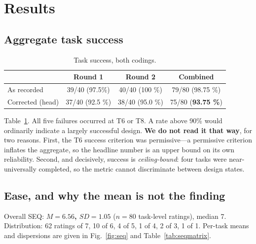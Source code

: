 \documentclass[conference]{IEEEtran}
\begin{document}
\section{Results}

\subsection{Aggregate task success}

\begin{table}[t]
\caption{Task success, both codings.}
\label{tab:success}
\centering
\begin{tabular}{@{}lccc@{}}
\toprule
 & Round 1 & Round 2 & Combined \\
\midrule
As recorded      & 39/40 (97.5\%) & 40/40 (100 \%) & 79/80 (98.75 \%) \\
Corrected (head) & 37/40 (92.5 \%) & 38/40 (95.0 \%) & 75/80 (\textbf{93.75 \%}) \\
\bottomrule
\end{tabular}
\end{table}

Table~\ref{tab:success}. All five failures occurred at T6 or T8. A rate above
90\% would ordinarily indicate a largely successful design. \textbf{We do not
read it that way}, for two reasons. First, the T6 success criterion was
permissive---a permissive criterion inflates the aggregate, so the headline
number is an upper bound on its own reliability. Second, and decisively,
success is \emph{ceiling-bound}: four tasks were near-universally completed, so
the metric cannot discriminate between design states.

\subsection{Ease, and why the mean is not the finding}

Overall SEQ: \textbf{$M=6.56$, $SD=1.05$} ($n=80$ task-level ratings), median
7. Distribution: 62 ratings of 7, 10 of 6, 4 of 5, 1 of 4, 2 of 3, 1 of 1.
Per-task means and dispersions are given in Fig.~\ref{fig:seq} and
Table~\ref{tab:seqmatrix}.
\end{document}
